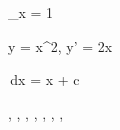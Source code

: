 \lim_{x }  = 1 %

y = x^2, y' = 2x %

\int {}\,dx = \log \lvert x \rvert + c %

\subset, \supset, \cup, \cap, \in, \notin,
\setminus, \emptyset %

